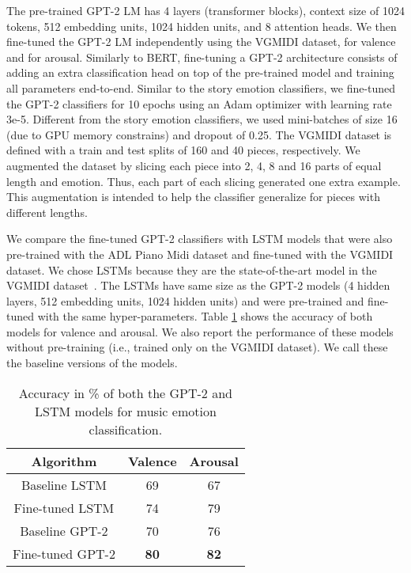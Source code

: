 The pre-trained GPT-2 LM has 4 layers (transformer blocks), context size of 1024
tokens, 512 embedding units, 1024 hidden units, and 8 attention heads.  We then fine-tuned the GPT-2 LM independently using the VGMIDI dataset, for valence
and for arousal. Similarly to BERT, fine-tuning a GPT-2
architecture consists of adding an extra classification head on top of the pre-trained model and training all parameters end-to-end. Similar to the story emotion classifiers, we
fine-tuned the GPT-2 classifiers for 10 epochs using an Adam optimizer with learning rate 3e-5. Different from the story emotion classifiers, we used mini-batches of size 16 (due to GPU memory constrains) and dropout of 0.25. The VGMIDI dataset is defined with a train and test splits of 160 and 40 pieces, respectively. We augmented the dataset by slicing each piece
into 2, 4, 8 and 16 parts of equal length and emotion. Thus, each part of each slicing
generated one extra example. This augmentation is intended
to help the classifier generalize for pieces
with different lengths.

We compare the fine-tuned GPT-2 classifiers with LSTM models that were also
pre-trained with the ADL Piano Midi dataset and fine-tuned with the VGMIDI dataset. We chose LSTMs because they are the state-of-the-art model in the VGMIDI dataset~\cite{ferreira_2019}. The LSTMs have same size as the GPT-2 models (4 hidden layers, 512 embedding units, 1024 hidden units) and were pre-trained and fine-tuned with the same hyper-parameters.
Table \ref{tab:sent_accuracy} shows the accuracy of both models for valence and arousal. We also report the performance of these models
without pre-training (i.e., trained only on the VGMIDI dataset). We call
these the baseline versions of the models.

\begin{table}[t!]
    \centering
    \begin{tabular}{ccc}
    \toprule
    \textbf{Algorithm} & \textbf{Valence} & \textbf{Arousal} \\
    \midrule
    Baseline LSTM & 69 & 67 \\
    Fine-tuned LSTM & 74 & 79 \\
    Baseline GPT-2 & 70 & 76 \\
    Fine-tuned GPT-2 & \textbf{80} & \textbf{82} \\
    \bottomrule
    \end{tabular}
    \caption{Accuracy in \% of both the GPT-2 and LSTM models for music emotion classification. }
    \label{tab:sent_accuracy}
\end{table}

